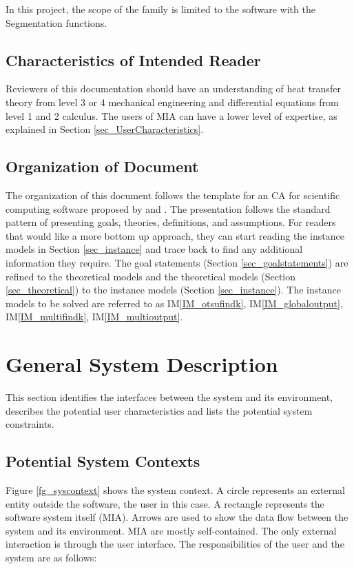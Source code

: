 \documentclass[12pt]{article}
\newcommand{\iref}[1]{IM\ref{#1}}
\newcommand{\famname}{MIA} %
\begin{document}
In this project, the scope of the family is limited to the software with the Segmentation functions.

\subsection{Characteristics of Intended Reader} 

Reviewers of this documentation should have an understanding of heat transfer theory from
level 3 or 4 mechanical engineering and differential equations from level 1 and 2 calculus.
The users of MIA can have a lower level of expertise, as explained in Section \ref{sec_UserCharacteristics}.


\subsection{Organization of Document}

The organization of this document follows the template for an CA for scientific computing software proposed by \cite{Parnas1972} and \cite{ParnasAndClements1986}. The presentation follows the standard pattern of presenting goals, theories, definitions, and assumptions. For readers that would like a more bottom up approach, they can start reading the instance
models in Section \ref{sec_instance} and trace back to find any additional information they require.
The goal statements (Section \ref{sec_goalstatements}) are refined to the theoretical models and the theoretical models (Section \ref{sec_theoretical}) to the instance models (Section \ref{sec_instance}). The instance models to be solved are referred to as \iref{IM_otsufindk}, \iref{IM_globaloutput}, \iref{IM_multifindk}, \iref{IM_multioutput}.

\section{General System Description}

This section identifies the interfaces between the system and its environment,
describes the potential user characteristics and lists the potential system
constraints.

\subsection{Potential System Contexts}

Figure \ref{fg_syscontext} shows the system context. A circle represents an external entity outside the software, the user in this case. A rectangle represents the software system itself (\famname).
Arrows are used to show the data flow between the system and its environment.
\famname{} are mostly self-contained. The only external interaction is through the user interface. The responsibilities of the user and the system are as follows:
\end{document}
